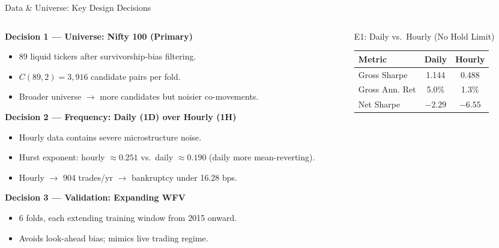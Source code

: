 \documentclass[aspectratio=169,10pt]{beamer}
\begin{document}
\begin{frame}{Data \& Universe: Key Design Decisions}
  \begin{columns}[T]
    \begin{column}{0.54\textwidth}
      \textbf{Decision 1 --- Universe: Nifty 100 (Primary)}
      \begin{itemize}\itemsep2pt
        \item 89 liquid tickers after survivorship-bias filtering.
        \item $C(89,2) = 3{,}916$ candidate pairs per fold.
        \item Broader universe $\to$ more candidates but noisier co-movements.
      \end{itemize}
      \vspace{5pt}
      \textbf{Decision 2 --- Frequency: Daily (1D) over Hourly (1H)}
      \begin{itemize}\itemsep2pt
        \item Hourly data contains severe microstructure noise.
        \item Hurst exponent: hourly $\approx 0.251$ vs.\ daily $\approx 0.190$ (daily more mean-reverting).
        \item Hourly $\to$ 904 trades/yr $\to$ \alert{bankruptcy} under 16.28 bps.
      \end{itemize}
      \vspace{5pt}
      \textbf{Decision 3 --- Validation: Expanding WFV}
      \begin{itemize}\itemsep2pt
        \item 6 folds, each extending training window from 2015 onward.
        \item Avoids look-ahead bias; mimics live trading regime.
      \end{itemize}
    \end{column}
    \begin{column}{0.43\textwidth}
      \begin{block}{E1: Daily vs.\ Hourly (No Hold Limit)}
        \centering\scriptsize
        \renewcommand{\arraystretch}{1.2}
        \begin{tabular}{lcc}
          \toprule
          \textbf{Metric} & \textbf{Daily} & \textbf{Hourly} \\
          \midrule
          Gross Sharpe   & 1.144 & 0.488 \\
          Gross Ann. Ret & 5.0\% & 1.3\% \\
          Net Sharpe     & \textcolor{badred}{$-2.29$} & \textcolor{badred}{$-6.55$} \\

\end{tabular}
\end{block}
\end{column}
\end{columns}
\end{frame}
\end{document}
